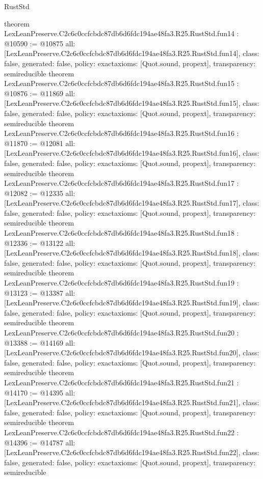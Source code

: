 \begin{lexlean}{RustStd}
\begin{coremodule}
{}
theorem LexLeanPreserve.C2c6c0ccfcbdc87db6d6fdc194ae48fa3.R25.RustStd.fun14 : @10590 := @10875 {
  all: [LexLeanPreserve.C2c6c0ccfcbdc87db6d6fdc194ae48fa3.R25.RustStd.fun14],
  class: false,
  generated: false,
  policy: exact{axioms: [Quot.sound, propext]},
  transparency: semireducible
}
theorem LexLeanPreserve.C2c6c0ccfcbdc87db6d6fdc194ae48fa3.R25.RustStd.fun15 : @10876 := @11869 {
  all: [LexLeanPreserve.C2c6c0ccfcbdc87db6d6fdc194ae48fa3.R25.RustStd.fun15],
  class: false,
  generated: false,
  policy: exact{axioms: [Quot.sound, propext]},
  transparency: semireducible
}
theorem LexLeanPreserve.C2c6c0ccfcbdc87db6d6fdc194ae48fa3.R25.RustStd.fun16 : @11870 := @12081 {
  all: [LexLeanPreserve.C2c6c0ccfcbdc87db6d6fdc194ae48fa3.R25.RustStd.fun16],
  class: false,
  generated: false,
  policy: exact{axioms: [Quot.sound, propext]},
  transparency: semireducible
}
theorem LexLeanPreserve.C2c6c0ccfcbdc87db6d6fdc194ae48fa3.R25.RustStd.fun17 : @12082 := @12335 {
  all: [LexLeanPreserve.C2c6c0ccfcbdc87db6d6fdc194ae48fa3.R25.RustStd.fun17],
  class: false,
  generated: false,
  policy: exact{axioms: [Quot.sound, propext]},
  transparency: semireducible
}
theorem LexLeanPreserve.C2c6c0ccfcbdc87db6d6fdc194ae48fa3.R25.RustStd.fun18 : @12336 := @13122 {
  all: [LexLeanPreserve.C2c6c0ccfcbdc87db6d6fdc194ae48fa3.R25.RustStd.fun18],
  class: false,
  generated: false,
  policy: exact{axioms: [Quot.sound, propext]},
  transparency: semireducible
}
theorem LexLeanPreserve.C2c6c0ccfcbdc87db6d6fdc194ae48fa3.R25.RustStd.fun19 : @13123 := @13387 {
  all: [LexLeanPreserve.C2c6c0ccfcbdc87db6d6fdc194ae48fa3.R25.RustStd.fun19],
  class: false,
  generated: false,
  policy: exact{axioms: [Quot.sound, propext]},
  transparency: semireducible
}
theorem LexLeanPreserve.C2c6c0ccfcbdc87db6d6fdc194ae48fa3.R25.RustStd.fun20 : @13388 := @14169 {
  all: [LexLeanPreserve.C2c6c0ccfcbdc87db6d6fdc194ae48fa3.R25.RustStd.fun20],
  class: false,
  generated: false,
  policy: exact{axioms: [Quot.sound, propext]},
  transparency: semireducible
}
theorem LexLeanPreserve.C2c6c0ccfcbdc87db6d6fdc194ae48fa3.R25.RustStd.fun21 : @14170 := @14395 {
  all: [LexLeanPreserve.C2c6c0ccfcbdc87db6d6fdc194ae48fa3.R25.RustStd.fun21],
  class: false,
  generated: false,
  policy: exact{axioms: [Quot.sound, propext]},
  transparency: semireducible
}
theorem LexLeanPreserve.C2c6c0ccfcbdc87db6d6fdc194ae48fa3.R25.RustStd.fun22 : @14396 := @14787 {
  all: [LexLeanPreserve.C2c6c0ccfcbdc87db6d6fdc194ae48fa3.R25.RustStd.fun22],
  class: false,
  generated: false,
  policy: exact{axioms: [Quot.sound, propext]},
  transparency: semireducible
}
\end{coremodule}
\end{lexlean}

